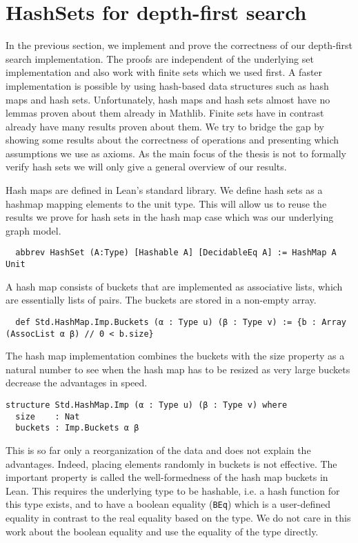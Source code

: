 \section{HashSets for depth-first search}

In the previous section, we implement and prove the correctness of our depth-first search implementation. The proofs are independent of the underlying set implementation and also work with finite sets which we used first. A faster implementation is possible by using hash-based data structures such as hash maps and hash sets. Unfortunately, hash maps and hash sets almost have no lemmas proven about them already in Mathlib. Finite sets have in contrast already have many results proven about them. We try to bridge the gap by showing some results about the correctness of operations and presenting which assumptions we use as axioms. As the main focus of the thesis is not to formally verify hash sets we will only give a general overview of our results.

Hash maps are defined in Lean's standard library. We define hash sets as a hashmap mapping elements to the unit type. This will allow us to reuse the results we prove for hash sets in the hash map case which was our underlying graph model.

\begin{lstlisting}
  abbrev HashSet (A:Type) [Hashable A] [DecidableEq A] := HashMap A Unit
\end{lstlisting}

A hash map consists of buckets that are implemented as associative lists, which are essentially lists of pairs. The buckets are stored in a non-empty array.

\begin{lstlisting}
  def Std.HashMap.Imp.Buckets (α : Type u) (β : Type v) := {b : Array (AssocList α β) // 0 < b.size}
\end{lstlisting}

The hash map implementation combines the buckets with the size property as a natural number to see when the hash map has to be resized as very large buckets decrease the advantages in speed. 

\begin{lstlisting}
structure Std.HashMap.Imp (α : Type u) (β : Type v) where
  size    : Nat
  buckets : Imp.Buckets α β
\end{lstlisting}

This is so far only a reorganization of the data and does not explain the advantages. Indeed, placing elements randomly in buckets is not effective. The important property is called the well-formedness of the hash map buckets in Lean. This requires the underlying type to be hashable, i.e. a hash function for this type exists, and to have a boolean equality (\lstinline|BEq|) which is a user-defined equality in contrast to the real equality based on the type. We do not care in this work about the boolean equality and use the equality of the type directly.

